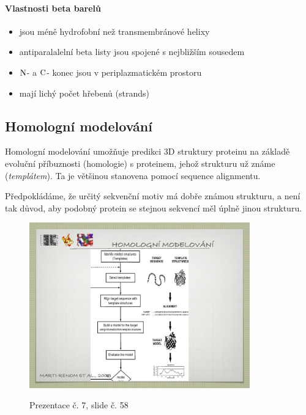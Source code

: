 \documentclass[DIV=8]{scrreprt}
\begin{document}
\paragraph{Vlastnosti beta barelů}
\begin{itemize}[nosep]
    \item jsou méně hydrofobní než transmembránové helixy
    \item antiparalalelní beta listy jsou spojené s nejbližším sousedem
    \item \(\ce{N}\)- a \(\ce{C}\)- konec jsou v periplazmatickém prostoru
    \item mají lichý počet hřebenů (strands)
\end{itemize}



\subsection{Homologní modelování} \label{Homologní modelování}


Homologní modelování umožňuje predikci 3D struktury proteinu na základě evoluční příbuznosti (homologie) s proteinem, jehož strukturu už známe (\emph{templátem}). Ta je většinou stanovena pomocí sequence alignmentu.

Předpokládáme, že určitý sekvenční motiv má dobře známou strukturu, a není tak důvod, aby podobný protein se stejnou sekvencí měl úplně jinou strukturu.

\begin{figure}
    \caption{Prezentace č. 7, slide č. 58}
    \includegraphics[width=0.85\textwidth]{slides-7/slide-58.jpg}
    \centering
    \label{slides-7-slide-58}
\end{figure}
\end{document}
